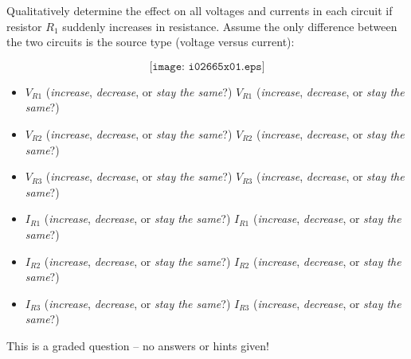 

Qualitatively determine the effect on all voltages and currents in each circuit if resistor $R_1$ suddenly increases in resistance.  Assume the only difference between the two circuits is the source type (voltage versus current):

$$\texttt{[image: i02665x01.eps]}$$

\begin{itemize}
\item{} $V_{R1}$ ({\it increase}, {\it decrease}, or {\it stay the same}?) \hskip 50pt $V_{R1}$ ({\it increase}, {\it decrease}, or {\it stay the same}?)
\item{} $V_{R2}$ ({\it increase}, {\it decrease}, or {\it stay the same}?) \hskip 50pt $V_{R2}$ ({\it increase}, {\it decrease}, or {\it stay the same}?)
\item{} $V_{R3}$ ({\it increase}, {\it decrease}, or {\it stay the same}?) \hskip 50pt $V_{R3}$ ({\it increase}, {\it decrease}, or {\it stay the same}?)
\end{itemize}

\begin{itemize}
\item{} $I_{R1}$ ({\it increase}, {\it decrease}, or {\it stay the same}?) \hskip 50pt $I_{R1}$ ({\it increase}, {\it decrease}, or {\it stay the same}?)
\item{} $I_{R2}$ ({\it increase}, {\it decrease}, or {\it stay the same}?) \hskip 50pt $I_{R2}$ ({\it increase}, {\it decrease}, or {\it stay the same}?)
\item{} $I_{R3}$ ({\it increase}, {\it decrease}, or {\it stay the same}?) \hskip 50pt $I_{R3}$ ({\it increase}, {\it decrease}, or {\it stay the same}?)
\end{itemize}

\vfil 

\eject






This is a graded question -- no answers or hints given!






